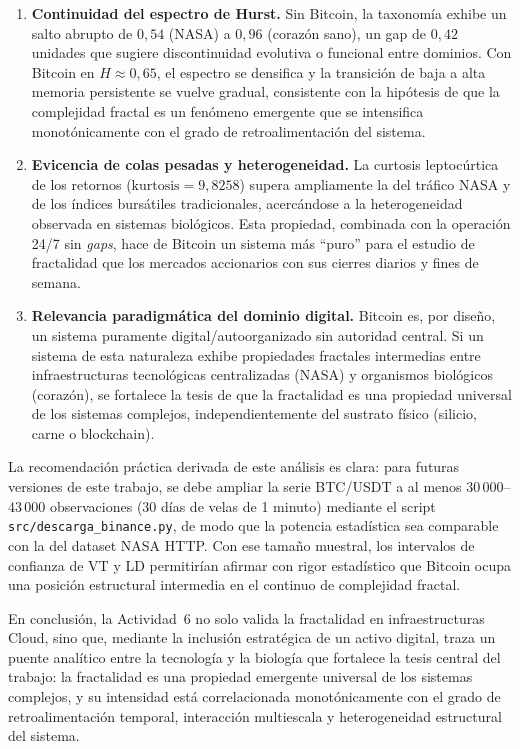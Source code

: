 \begin{enumerate}[leftmargin=2em]
    \item \textbf{Continuidad del espectro de Hurst.} Sin Bitcoin, la taxonomía
          exhibe un salto abrupto de $0{,}54$ (NASA) a $0{,}96$ (corazón sano),
          un gap de $0{,}42$ unidades que sugiere discontinuidad evolutiva o
          funcional entre dominios. Con Bitcoin en $H \approx 0{,}65$, el
          espectro se densifica y la transición de baja a alta memoria
          persistente se vuelve gradual, consistente con la hipótesis de que
          la complejidad fractal es un fenómeno emergente que se intensifica
          monotónicamente con el grado de retroalimentación del sistema.
    \item \textbf{Evicencia de colas pesadas y heterogeneidad.} La curtosis
          leptocúrtica de los retornos ($\text{kurtosis} = 9{,}8258$) supera
          ampliamente la del tráfico NASA y de los índices bursátiles
          tradicionales, acercándose a la heterogeneidad observada en sistemas
          biológicos. Esta propiedad, combinada con la operación 24/7 sin
          \textit{gaps}, hace de Bitcoin un sistema más ``puro'' para el estudio
          de fractalidad que los mercados accionarios con sus cierres diarios
          y fines de semana.
    \item \textbf{Relevancia paradigmática del dominio digital.} Bitcoin es,
          por diseño, un sistema puramente digital/autoorganizado sin
          autoridad central. Si un sistema de esta naturaleza exhibe propiedades
          fractales intermedias entre infraestructuras tecnológicas
          centralizadas (NASA) y organismos biológicos (corazón), se fortalece
          la tesis de que la fractalidad es una propiedad universal de los
          sistemas complejos, independientemente del sustrato físico
          (silicio, carne o blockchain).
\end{enumerate}

La recomendación práctica derivada de este análisis es clara: para futuras
versiones de este trabajo, se debe ampliar la serie BTC/USDT a al menos
$30\,000$--$43\,000$ observaciones (30 días de velas de 1 minuto) mediante el
script \texttt{src/descarga\_binance.py}, de modo que la potencia estadística
sea comparable con la del dataset NASA HTTP. Con ese tamaño muestral, los
intervalos de confianza de VT y LD permitirían afirmar con rigor estadístico
que Bitcoin ocupa una posición estructural intermedia en el continuo de
complejidad fractal.

En conclusión, la Actividad~6 no solo valida la fractalidad en infraestructuras
Cloud, sino que, mediante la inclusión estratégica de un activo digital, traza
un puente analítico entre la tecnología y la biología que fortalece la tesis
central del trabajo: la fractalidad es una propiedad emergente universal de los
sistemas complejos, y su intensidad está correlacionada monotónicamente con el
grado de retroalimentación temporal, interacción multiescala y heterogeneidad
estructural del sistema.
